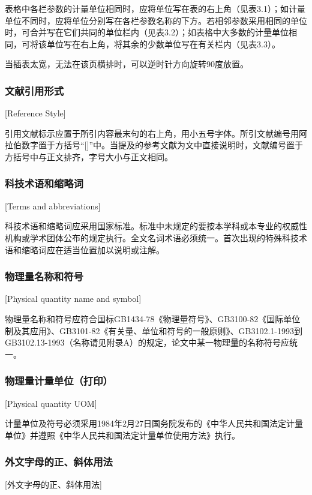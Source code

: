 表格中各栏参数的计量单位相同时，应将单位写在表的右上角（见表3.1）；如计量单位不同时，应将单位分别写在各栏参数名称的下方。若相邻参数采用相同的单位时，可合并写在它们共同的单位栏内（见表3.2）；如表格中大多数的计量单位相同，可将该单位写在右上角，将其余的少数单位写在有关栏内（见表3.3）。

当插表太宽，无法在该页横排时，可以逆时针方向旋转90度放置。

\subsubsection{文献引用形式}[Reference Style]

引用文献标示应置于所引内容最末句的右上角，用小五号字体。所引文献编号用阿拉伯数字置于方括号“[]”中。当提及的参考文献为文中直接说明时，文献编号置于方括号中与正文排齐，字号大小与正文相同。

\subsubsection{科技术语和缩略词}[Terms and abbreviations]

科技术语和缩略词应采用国家标准。标准中未规定的要按本学科或本专业的权威性机构或学术团体公布的规定执行。全文名词术语必须统一。首次出现的特殊科技术语和缩略词应在适当位置加以说明或注解。

\subsubsection{物理量名称和符号}[Physical quantity name and symbol]

物理量名称和符号应符合国标GB1434-78《物理量符号》、GB3100-82《国际单位制及其应用》、GB3101-82《有关量、单位和符号的一般原则》、GB3102.1-1993到GB3102.13-1993（名称请见附录A）的规定，论文中某一物理量的名称符号应统一。

\subsubsection{物理量计量单位（打印）}[Physical quantity UOM]

计量单位及符号必须采用1984年2月27日国务院发布的《中华人民共和国法定计量单位》并遵照《中华人民共和国法定计量单位使用方法》执行。

\subsubsection{外文字母的正、斜体用法}[外文字母的正、斜体用法]

